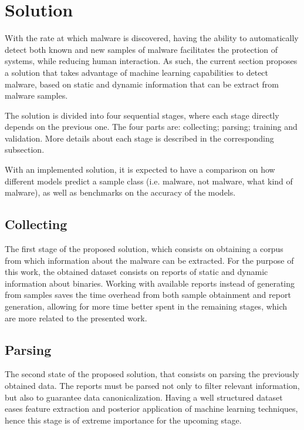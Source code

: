 \documentclass{llncs}
\begin{document}
% 

\section{Solution}\label{sec:solution}

With the rate at which malware is discovered, having the ability to automatically detect both known and new samples of malware facilitates the protection of systems, while reducing human interaction. As such, the current section proposes a solution that takes advantage of machine learning capabilities to detect malware, based on static and dynamic information that can be extract from malware samples.

The solution is divided into four sequential stages, where each stage directly depends on the previous one. The four parts are: collecting; parsing; training and validation. More details about each stage is described in the corresponding subsection.

With an implemented solution, it is expected to have a comparison on how different models predict a sample class (i.e. malware, not malware, what kind of malware), as well as benchmarks on the accuracy of the models.

\subsection{Collecting}
The first stage of the proposed solution, which consists on obtaining a corpus from which information about the malware can be extracted. For the purpose of this work, the obtained dataset consists on reports of static and dynamic information about binaries. Working with available reports instead of generating from samples saves the time overhead from both sample obtainment and report generation, allowing for more time better spent in the remaining stages, which are more related to the presented work.

\subsection{Parsing}
The second state of the proposed solution, that consists on parsing the previously obtained data. The reports must be parsed not only to filter relevant information, but also to guarantee data canonicalization. Having a well structured dataset eases feature extraction and posterior application of machine learning techniques, hence this stage is of extreme importance for the upcoming stage.
\end{document}
